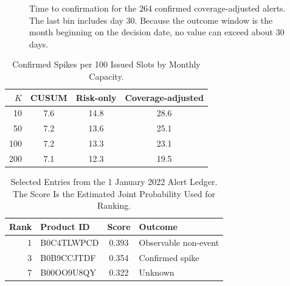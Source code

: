 \documentclass[conference]{IEEEtran}
\begin{document}
\begin{figure}[t]
\centering
{}
\caption{Time to confirmation for the 264 confirmed coverage-adjusted alerts. The last bin includes day 30. Because the outcome window is the month beginning on the decision date, no value can exceed about 30 days.}
\label{fig:confirm}
\end{figure}


\begin{table}[t]
\caption{Confirmed Spikes per 100 Issued Slots by Monthly Capacity.}
\label{tab:capacity}
\centering\footnotesize
\begin{tabular}{@{}rccc@{}}
\toprule
$K$ & CUSUM & Risk-only & Coverage-adjusted \\
\midrule
10 & 7.6 & 14.8 & 28.6 \\
50 & 7.2 & 13.6 & 25.1 \\
100 & 7.2 & 13.3 & 23.1 \\
200 & 7.1 & 12.3 & 19.5 \\
\bottomrule
\end{tabular}
\end{table}

\begin{table}[t]
\caption{Selected Entries from the 1 January 2022 Alert Ledger. The Score Is the Estimated Joint Probability Used for Ranking.}
\label{tab:ledger}
\centering\footnotesize
\begin{tabular}{@{}rlcl@{}}
\toprule
Rank & Product ID & Score & Outcome \\
\midrule
1 & B0C4TLWPCD & 0.393 & Observable non-event \\
3 & B0B9CCJTDF & 0.354 & Confirmed spike \\
7 & B00OO9U8QY & 0.322 & Unknown \\
\bottomrule
\end{tabular}
\end{table}
\end{document}
